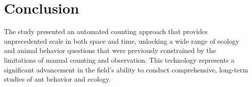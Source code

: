 \section{Conclusion}

The study presented an automated counting approach that provides unprecedented scale in both space and time, unlocking a wide range of ecology and animal behavior questions that were previously constrained by the limitations of manual counting and observation. This technology represents a significant advancement in the field's ability to conduct comprehensive, long-term studies of ant behavior and ecology.
